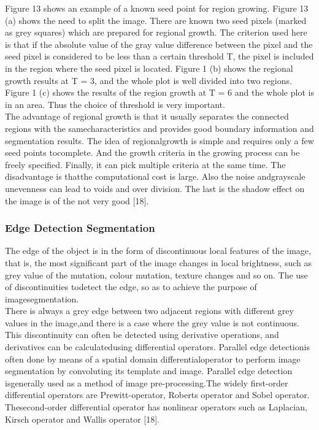 \begin{enumerate}{}
                Figure 13 shows an example of a known seed point for region growing.
                Figure 13 (a) shows the need to split the image. There are known two seed pixels
                (marked as grey squares) which are prepared for regional growth. The criterion used here is
                that if the absolute value of the gray value difference between the pixel and the seed pixel
                is considered to be less than a certain threshold T, the pixel is included in the region where
                the seed pixel is located. Figure 1 (b) shows the regional growth results at T = 3,
                and the whole plot is well divided into two regions. Figure 1 (c) shows the results of
                the region growth at T = 6 and the whole plot is in an area. Thus the choice of threshold is very important.\\
                The advantage of regional growth is that it usually separates the connected regions with the
                samecharacteristics and provides good boundary information and segmentation results. The idea of regionalgrowth
                is simple and requires only a few seed points tocomplete. And the growth criteria in the growing process
                can be freely specified. Finally, it can pick multiple criteria at the same time. The disadvantage is thatthe
                computational cost is large. Also the noise andgrayscale unevenness can lead to voids and over division.
                The last is the shadow effect on the image is of the not very good [18].
        \end{enumerate}

\subsubsection{Edge Detection Segmentation}
The edge of the object is in the form of discontinuous local features of the image, that is,
the most significant part of the image changes in local brightness, such as grey value of the mutation,
colour mutation, texture changes and so on. The use of discontinuities todetect the edge, so as to achieve the purpose of imagesegmentation.\\
There is always a grey edge between two adjacent regions with different grey values in the image,and there is a
case where the grey value is not continuous. This discontinuity can often be detected using derivative operations,
and derivatives can be calculatedusing differential operators. Parallel edge detectionis often done by means of a spatial
domain differentialoperator to perform image segmentation by convoluting its template and image. Parallel edge detection
isgenerally used as a method of image pre-processing.The widely first-order differential operators are Prewitt-operator,
Roberts operator and Sobel operator. Thesecond-order differential operator has nonlinear operators such as Laplacian,
Kirsch operator and Wallis operator [18].\\

